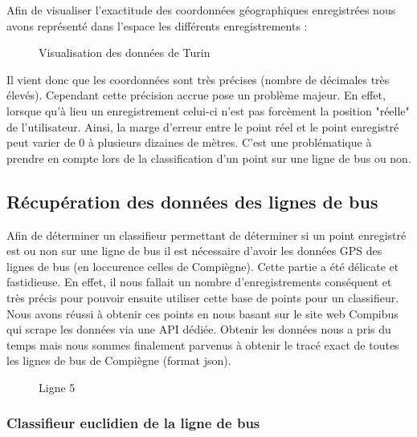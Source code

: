 \documentclass{article}
\begin{document}
Afin de visualiser l'exactitude des coordonnées géographiques enregistrées nous avons représenté dans l'espace les différents enregistrements :

\begin{figure}[!h]
  \centering{}
 \captionsetup{justification=centering}
    \caption{Visualisation des données de Turin}
\end{figure}

Il vient donc que les coordonnées sont très précises (nombre de décimales très élevés). Cependant cette précision accrue pose un problème majeur. En effet, lorsque qu'à lieu un enregistrement celui-ci n'est pas forcèment la position "réelle" de l'utilisateur. Ainsi, la marge d'erreur entre le point réel et le point enregistré peut varier de 0 à plusieurs dizaines de mètres. C'est une problématique à prendre en compte lors de la classification d'un point sur une ligne de bus ou non.



\subsection{Récupération des données des lignes de bus}

Afin de déterminer un classifieur permettant de déterminer si un point enregistré est ou non sur une ligne de bus il est nécessaire d'avoir les données GPS des lignes de bus (en loccurence celles de Compiègne).
Cette partie a été délicate et fastidieuse. En effet, il nous fallait un nombre d'enregistrements conséquent  et très précis pour pouvoir ensuite utiliser cette base de points pour un classifieur.
Nous avons réussi à obtenir ces points en nous basant sur le site web Compibus qui scrape les données via une API dédiée.
Obtenir les données nous a pris du temps mais nous sommes finalement parvenus à obtenir le tracé exact de toutes les lignes de bus de Compiègne (format json).

\begin{figure}[!h]
  \centering{}
 \captionsetup{justification=centering}
    \caption{Ligne 5}
\end{figure}



\subsubsection{Classifieur euclidien de la ligne de bus}
\end{document}
